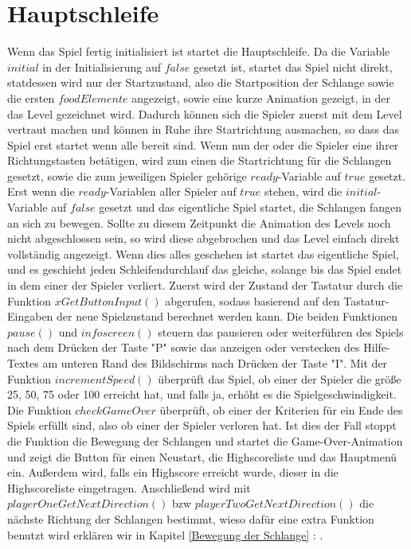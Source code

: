 \section{Hauptschleife}
\label{Hauptschleife}
%
Wenn das Spiel fertig initialisiert ist startet die Hauptschleife. Da die Variable $initial$ in der Initialisierung auf $false$ gesetzt ist, startet das Spiel nicht direkt, statdessen wird nur der Startzustand, also die Startposition der Schlange sowie die ersten $foodElemente$ angezeigt, sowie eine kurze Animation gezeigt, in der das Level gezeichnet wird. Dadurch können sich die Spieler zuerst mit dem Level vertraut machen und können in Ruhe ihre Startrichtung ausmachen, so dass das Spiel erst startet wenn alle bereit sind. Wenn nun der oder die Spieler eine ihrer Richtungstasten betätigen, wird zum einen die Startrichtung für die Schlangen gesetzt, sowie die zum jeweiligen Spieler gehörige $ready$-Variable auf $true$ gesetzt. Erst wenn die $ready$-Variablen aller Spieler auf $true$ stehen, wird die $initial$-Variable auf $false$ gesetzt und das eigentliche Spiel startet, die Schlangen fangen an sich zu bewegen. Sollte zu diesem Zeitpunkt die Animation des Levels noch nicht abgeschlossen sein, so wird diese abgebrochen und das Level einfach direkt vollständig angezeigt.
Wenn dies alles geschehen ist startet das eigentliche Spiel, und es geschieht jeden Schleifendurchlauf das gleiche, solange bis das Spiel endet in dem einer der Spieler verliert.
Zuerst wird der Zustand der Tastatur durch die Funktion $xGetButtonInput()$ abgerufen, sodass basierend auf den Tastatur-Eingaben der neue Spielzustand berechnet werden kann. Die beiden Funktionen $pause()$ und $infoscreen()$ steuern das pausieren oder weiterführen des Spiels nach dem Drücken der Taste "P" sowie das anzeigen oder verstecken des Hilfe-Textes am unteren Rand des Bildschirms nach Drücken der Taste "I". Mit der Funktion $incrementSpeed()$ überprüft das Spiel, ob einer der Spieler die größe 25, 50, 75 oder 100 erreicht hat, und falls ja, erhöht es die Spielgeschwindigkeit. Die Funktion $checkGameOver$ überprüft, ob einer der Kriterien für ein Ende des Spiels erfüllt sind, also ob einer der Spieler verloren hat. Ist dies der Fall stoppt die Funktion die Bewegung der Schlangen und startet die Game-Over-Animation und zeigt die Button für einen Neustart, die Highscoreliste und das Hauptmenü ein. Außerdem wird, falls ein Highscore erreicht wurde, dieser in die Highscoreliste eingetragen.
Anschließend wird mit $playerOneGetNextDirection()$ bzw $playerTwoGetNextDirection()$ die nächste Richtung der Schlangen bestimmt, wieso dafür eine extra Funktion benutzt wird erklären wir in Kapitel \ref{Bewegung der Schlange}  : .
